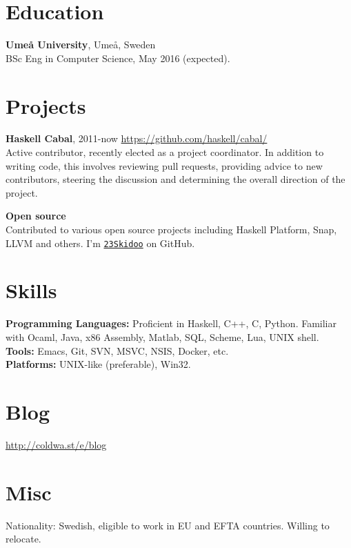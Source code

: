 \documentclass[margin,line]{res}
\begin{document}
\begin{resume}
\section{\sc Education}
{\bf Umeå University}, Umeå, Sweden\\
BSc Eng in Computer Science, May 2016 (expected).

\section{\sc Projects}

{\bf Haskell Cabal}, 2011-now \hfill \url{https://github.com/haskell/cabal/}\\
Active contributor, recently elected as a project coordinator. In addition to
writing code, this involves reviewing pull requests, providing advice to new
contributors, steering the discussion and determining the overall direction of
the project.

{\bf Open source}\\ Contributed to various open source projects including
Haskell Platform, Snap, LLVM and others. I'm
\href{https://github.com/23Skidoo/}{\texttt{23Skidoo}} on GitHub.

\section{\sc Skills}

{\bf Programming Languages:} Proficient in Haskell, C++, C, Python. Familiar
with Ocaml, Java, x86 Assembly, Matlab, SQL, Scheme, Lua, UNIX shell. \\
{\bf Tools:} Emacs, Git, SVN, MSVC, NSIS, Docker, etc.\\
{\bf Platforms:} UNIX-like (preferable), Win32.

\section{\sc Blog}
\url{http://coldwa.st/e/blog}

\section{\sc Misc}

Nationality: Swedish, eligible to work in EU and EFTA countries. Willing to relocate.

\end{resume}
\end{document}
